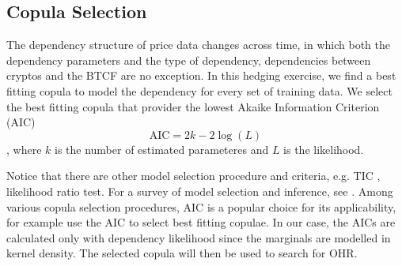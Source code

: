 \subsection{Copula Selection}\label{subsec:copula-selection}
The dependency structure of price data changes across time, in which both the dependency parameters and the type of dependency, dependencies between cryptos and the BTCF are no exception.
In this hedging exercise, we find a best fitting copula to model the dependency for every set of training data.
We select the best fitting copula that provider the lowest Akaike Information Criterion (AIC)
$$ \text{AIC} = 2k- 2 \log(L)$$, where $k$ is the number of estimated parameteres and $L$ is the likelihood. \medskip

Notice that there are other model selection procedure and criteria, e.g. TIC , likelihood ratio test.
For a survey of model selection and inference, see \cite{anderson1998comparison}.
Among various copula selection procedures, AIC is a popular choice for its applicability, for example \cite{breymann2003dependence} use the AIC to select best fitting copulae.
In our case, the AICs are calculated only with dependency likelihood since the marginals are modelled in kernel density.
The selected copula will then be used to search for OHR. \medskip
